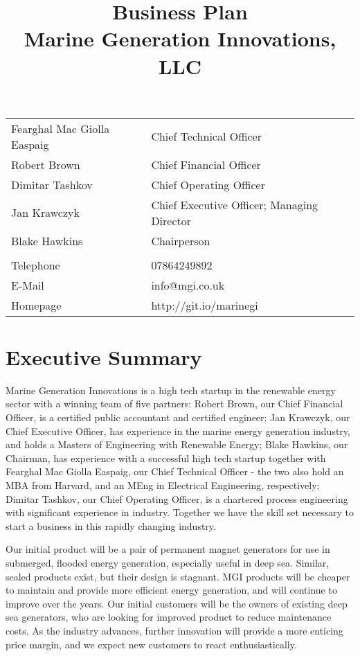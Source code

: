 \documentclass[a4paper,11pt]{article}
\title{Business Plan\\Marine Generation Innovations, LLC}
\begin{document}
\begin{titlepage}
    \centering
    \maketitle
    \thispagestyle{empty}   %
    \vfill
\begin{tabular}{l l}
    Fearghal Mac Giolla Easpaig & Chief Technical Officer \\
    Robert Brown & Chief Financial Officer \\
    Dimitar Tashkov & Chief Operating Officer \\
    Jan Krawczyk & Chief Executive Officer; Managing Director \\
    Blake Hawkins & Chairperson \\
    & \\
    Telephone & 07864249892 \\
    E-Mail & info@mgi.co.uk \\
    Homepage & http://git.io/marinegi
\end{tabular}

\end{titlepage}
\pagebreak

\tableofcontents
\pagebreak

\section{Executive Summary}

Marine Generation Innovations is a high tech startup in the renewable energy sector with a winning team of five partners: Robert Brown, our Chief Financial Officer, is a certified public accountant and certified engineer; Jan Krawczyk, our Chief Executive Officer, has experience in the marine energy generation industry, and holds a Masters of Engineering with Renewable Energy; Blake Hawkins, our Chairman, has experience with a successful high tech startup together with Fearghal Mac Giolla Easpaig, our Chief Technical Officer - the two also hold an MBA from Harvard, and an MEng in Electrical Engineering, respectively; Dimitar Tashkov, our Chief Operating Officer, is a chartered process engineering with significant experience in industry. Together we have the skill set necessary to start a business in this rapidly changing industry.

Our initial product will be a pair of permanent magnet generators for use in submerged, flooded energy generation, especially useful in deep sea. Similar, sealed products exist, but their design is stagnant. MGI products will be cheaper to maintain and provide more efficient energy generation, and will continue to improve over the years. Our initial customers will be the owners of existing deep sea generators, who are looking for improved product to reduce maintenance costs. As the industry advances, further innovation will provide a more enticing price margin, and we expect new customers to react enthusiastically.
\end{document}
